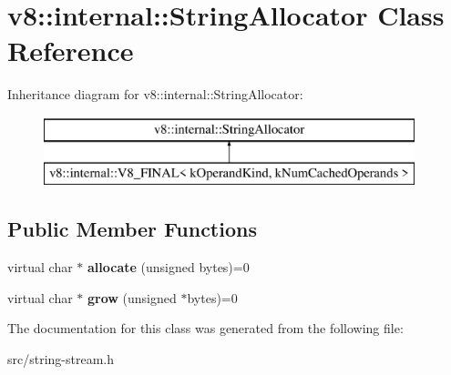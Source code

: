 \hypertarget{classv8_1_1internal_1_1_string_allocator}{}\section{v8\+:\+:internal\+:\+:String\+Allocator Class Reference}
\label{classv8_1_1internal_1_1_string_allocator}
Inheritance diagram for v8\+:\+:internal\+:\+:String\+Allocator\+:\begin{figure}[H]
\begin{center}
\leavevmode
\includegraphics[height=2.000000cm]{classv8_1_1internal_1_1_string_allocator}
\end{center}
\end{figure}
\subsection*{Public Member Functions}
\begin{DoxyCompactItemize}
\item 
\hypertarget{classv8_1_1internal_1_1_string_allocator_a3e2a67fc8455cf91240490208789967d}{}virtual char $\ast$ {\bfseries allocate} (unsigned bytes)=0\label{classv8_1_1internal_1_1_string_allocator_a3e2a67fc8455cf91240490208789967d}

\item 
\hypertarget{classv8_1_1internal_1_1_string_allocator_ac27c6a95c5a5e07d202f44f2d71febec}{}virtual char $\ast$ {\bfseries grow} (unsigned $\ast$bytes)=0\label{classv8_1_1internal_1_1_string_allocator_ac27c6a95c5a5e07d202f44f2d71febec}

\end{DoxyCompactItemize}


The documentation for this class was generated from the following file\+:\begin{DoxyCompactItemize}
\item 
src/string-\/stream.\+h\end{DoxyCompactItemize}
